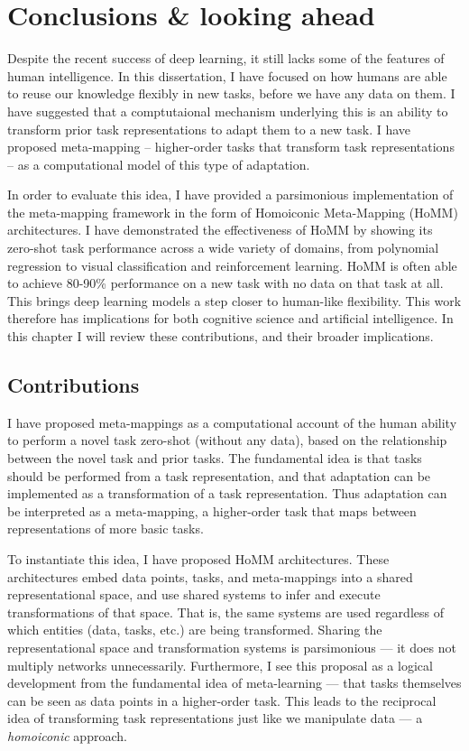 \chapter{Conclusions \& looking ahead} \label{chapter:conclusions}

Despite the recent success of deep learning, it still lacks some of the features of human intelligence. In this dissertation, I have focused on how humans are able to reuse our knowledge flexibly in new tasks, before we have any data on them. I have suggested that a comptutaional mechanism underlying this is an ability to transform prior task representations to adapt them to a new task. I have proposed meta-mapping -- higher-order tasks that transform task representations -- as a computational model of this type of adaptation. \par
In order to evaluate this idea, I have provided a parsimonious implementation of the meta-mapping framework in the form of Homoiconic Meta-Mapping (HoMM) architectures. I have demonstrated the effectiveness of HoMM by showing its zero-shot task performance across a wide variety of domains, from polynomial regression to visual classification and reinforcement learning. HoMM is often able to achieve 80-90\% performance on a new task with no data on that task at all. This brings deep learning models a step closer to human-like flexibility. This work therefore has implications for both cognitive science and artificial intelligence. In this chapter I will review these contributions, and their broader implications. \par  

\section{Contributions}

I have proposed meta-mappings as a computational account of the human ability to perform a novel task zero-shot (without any data), based on the relationship between the novel task and prior tasks. The fundamental idea is that tasks should be performed from a task representation, and that adaptation can be implemented as a transformation of a task representation. Thus adaptation can be interpreted as a meta-mapping, a higher-order task that maps between representations of more basic tasks. \par  

To instantiate this idea, I have proposed HoMM architectures. These architectures embed data points, tasks, and meta-mappings into a shared representational space, and use shared systems to infer and execute transformations of that space. That is, the same systems are used regardless of which entities (data, tasks, etc.) are being transformed. Sharing the representational space and transformation systems is parsimonious --- it does not multiply networks unnecessarily. Furthermore, I see this proposal as a logical development from the fundamental idea of meta-learning --- that tasks themselves can be seen as data points in a higher-order task. This leads to the reciprocal idea of transforming task representations just like we manipulate data --- a \emph{homoiconic} approach. \par  

